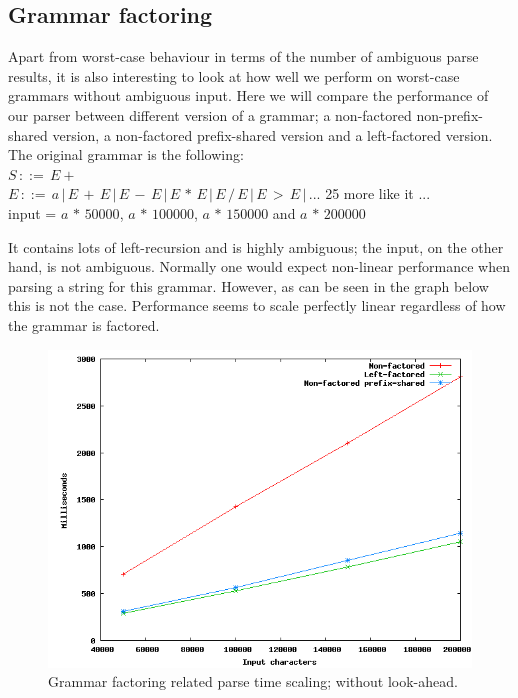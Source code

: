 \documentclass[a4paper,10pt]{article}
\begin{document}
\subsection{Grammar factoring}

Apart from worst-case behaviour in terms of the number of ambiguous parse results, it is also interesting to look at how well we perform on worst-case grammars without ambiguous input. Here we will compare the performance of our parser between different version of a grammar; a non-factored non-prefix-shared version, a non-factored prefix-shared version and a left-factored version. The original grammar is the following:\\
$S\,::=\,E+$\\
$E\,::=\,a\,|\,E\,+\,E\,|\,E\,-\,E\,|\,E\,*\,E\,|\,E\,/\,E\,|\,E\,>\,E\,|\,...$ 25 more like it ...\\
input = $a\,*\,50000$, $a\,*\,100000$, $a\,*\,150000$ and $a\,*\,200000$

It contains lots of left-recursion and is highly ambiguous; the input, on the other hand, is not ambiguous. Normally one would expect non-linear performance when parsing a string for this grammar. However, as can be seen in the graph below this is not the case. Performance seems to scale perfectly linear regardless of how the grammar is factored.

\begin{figure}[H]
\centering
\includegraphics[scale=0.5]{grammar-factoring.png}
\caption{Grammar factoring related parse time scaling; without look-ahead.}
\end{figure}
\end{document}
